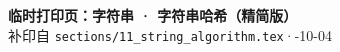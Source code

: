 \documentclass{article}
\begin{document}
	\begin{center}
		{\Large \textbf{临时打印页：字符串 · 字符串哈希（精简版）}} \\[4pt]
		{\small 补印自 \texttt{sections/11\_string\_algorithm.tex}\quad·-10-04}
	\end{center}

	\vspace{0.5em}

	
\end{document}
